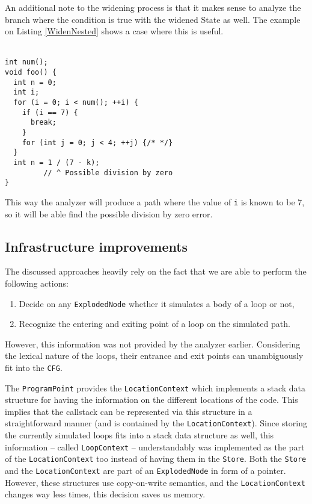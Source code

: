\documentclass[oneside, a4paper, 12pt]{article}
\theoremstyle{definition}
\begin{document}
An additional note to the widening process is that it makes sense to analyze the branch 
where the condition is true with the widened State as well. The example on 
Listing \ref{WidenNested} shows a case where this is useful.
\\
\\
\begin{lstlisting}
int num();
void foo() {
  int n = 0;
  int i;
  for (i = 0; i < num(); ++i) {
    if (i == 7) {
      break;
    }
    for (int j = 0; j < 4; ++j) {/* */}
  }
  int n = 1 / (7 - k);
         // ^ Possible division by zero
}\end{lstlisting}
This way the analyzer will produce a path where the value of \texttt{i} is 
known
to be 7, so it will be able find the possible division by zero error.
	
\subsection{Infrastructure improvements}\label{sec:inf}
The discussed approaches heavily rely on the fact that we are able to 
perform the following actions:
\begin{enumerate}
	\item Decide on any \texttt{ExplodedNode} whether it simulates a body of a 
	loop or not,
	\item Recognize the entering and exiting point of a loop on the simulated 
	path.
\end{enumerate}

However, this information was not provided by the analyzer earlier. Considering the 
lexical nature of the loops, their entrance and exit points can unambiguously 
fit into the \texttt{CFG}. 

The \texttt{ProgramPoint} provides the \texttt{LocationContext} which implements a stack data structure for having the information on the different locations of the code.  This implies that the callstack can be represented via this structure in a straightforward manner (and is contained by the \texttt{LocationContext}).
Since storing the currently simulated loops fits into a stack data structure as well, this information -- called \texttt{LoopContext} -- understandably was implemented as the part of the \texttt{LocationContext} too instead of having them in the \texttt{Store}. Both the \texttt{Store} and the \texttt{LocationContext} are part of an \texttt{ExplodedNode} in form of a pointer. However, these structures use copy-on-write semantics, and the \texttt{LocationContext} changes way less times, this decision saves us memory. 
\end{document}
